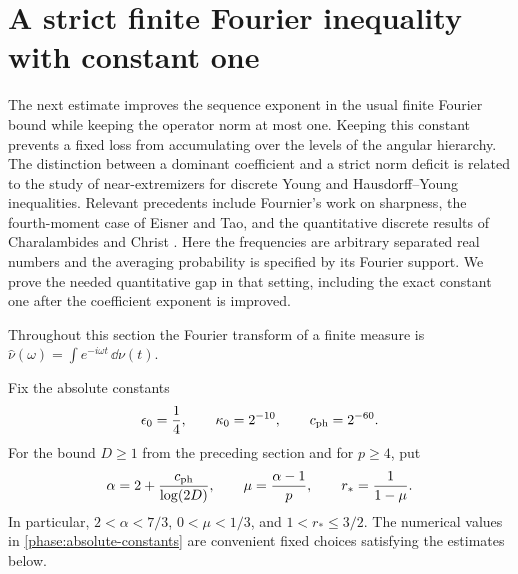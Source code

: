\section{A strict finite Fourier inequality with constant one}
\label{phase:section}

The next estimate improves the sequence exponent in the usual finite
Fourier bound while keeping the operator norm at most one. Keeping this
constant prevents a fixed loss from accumulating over the levels of the
angular hierarchy.
The distinction between a dominant coefficient and a strict norm
deficit is related to the study of near-extremizers for discrete Young
and Hausdorff--Young inequalities. Relevant precedents include
Fournier's work on sharpness, the fourth-moment case of Eisner and Tao,
and the quantitative discrete results of Charalambides and Christ
\cite{Fournier1977,EisnerTao2012,CharalambidesChrist2011}.
Here the frequencies are arbitrary separated real numbers and the
averaging probability is specified by its Fourier support. We prove
the needed quantitative gap in that setting, including the exact
constant one after the coefficient exponent is improved.

Throughout this section the Fourier transform of a finite measure is
\(\widehat\nu(\omega)=\int e^{-i\omega t}\,\dd\nu(t)\).

Fix the absolute constants
\begin{equation}
 \epsilon_0=\frac14,
 \qquad \kappa_0=2^{-10},
 \qquad c_{\rm ph}=2^{-60}.
 \label{phase:absolute-constants}
\end{equation}
For the bound \(D\ge1\) from the preceding section and for \(p\ge4\), put
\begin{equation}
 \alpha=2+\frac{c_{\rm ph}}{\log(2D)},
 \qquad \mu=\frac{\alpha-1}{p},
 \qquad r_* = \frac{1}{1-\mu}.
 \label{phase:parameters}
\end{equation}
In particular, \(2<\alpha<7/3\), \(0<\mu<1/3\), and
\(1<r_*\le3/2\). The numerical values in
\eqref{phase:absolute-constants} are convenient fixed choices satisfying
the estimates below.

